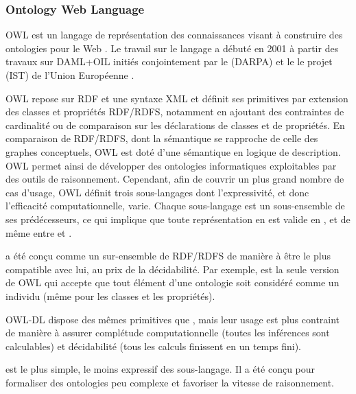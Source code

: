 




\subsubsection{Ontology Web Language}\label{sec:owl}
OWL est un langage de représentation des connaissances visant à construire des ontologies pour le Web .
Le travail sur le langage a débuté en 2001 à partir des travaux sur DAML+OIL initiés conjointement par le  (DARPA) et le le projet  (IST) de l'Union Européenne .

OWL repose sur RDF et une syntaxe XML et définit ses primitives par extension des classes et propriétés RDF/RDFS, notamment en ajoutant des contraintes de cardinalité ou de comparaison sur les déclarations de classes et de propriétés.
En comparaison de RDF/RDFS, dont la sémantique se rapproche de celle des graphes conceptuels, OWL est doté d'une sémantique en logique de description.
OWL permet ainsi de développer des ontologies informatiques exploitables par des outils de raisonnement.
Cependant, afin de couvrir un plus grand nombre de cas d'usage, OWL définit trois sous-langages dont l'expressivité, et donc l'efficacité computationnelle, varie. 
Chaque sous-langage est un sous-ensemble de ses prédécesseurs, ce qui implique que toute représentation en  est valide en , et de même entre  et .

\begin{liste}
  \item {} a été conçu comme un sur-ensemble de RDF/RDFS de manière à être le plus compatible avec lui, au prix de la décidabilité.
  Par exemple,  est la seule version de OWL qui accepte que tout élément d'une ontologie soit considéré comme un individu (même pour les classes et les propriétés).

  \item OWL-DL dispose des mêmes primitives que , mais leur usage est plus contraint de manière à assurer complétude computationnelle (toutes les inférences sont calculables) et décidabilité (tous les calculs finissent en un temps fini).

	\item {} est le plus simple, le moins expressif des sous-langage.
  Il a été conçu pour formaliser des ontologies peu complexe et favoriser la vitesse de raisonnement.	
\end{liste}

